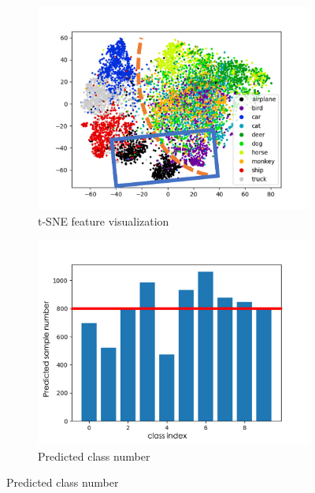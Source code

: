 \documentclass{article}
\begin{document}
\begin{figure}[hbt!]
     \centering
     \begin{subfigure}[b]{0.45\textwidth}
         \centering
         \includegraphics[width=\textwidth]{images/stl10_tsne.png}
         \caption{t-SNE feature visualization}
         \label{fig:t_sne}
     \end{subfigure}
     \hfill
     \begin{subfigure}[b]{0.45\textwidth}
         \centering
         \includegraphics[width=\textwidth]{images/stl10.png}
         \caption{Predicted class number}
         \label{fig:distribution}
     \end{subfigure}
     \caption{Predicted class number}
     \label{fig:combine}
\end{figure}
\end{document}
